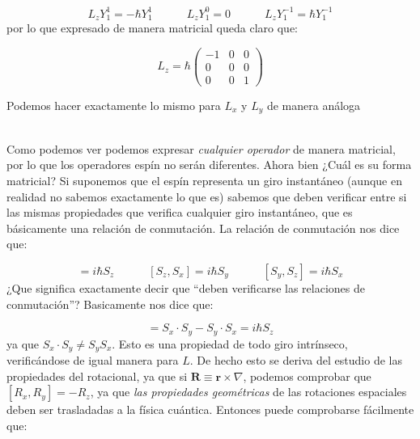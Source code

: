 \documentclass[12pt,a4paper]{article}
\numberwithin{equation}{section}
\numberwithin{figure}{section}
\newcommand{\tquad}{\quad \quad \quad}
\newcommand{\rn}{\mathbf{r}}
\newcommand{\Rn}{\mathbf{R}}
\begin{document}
$$L_z Y_1^1 =  - \hbar Y_1^1 \tquad L_z Y_1^0 = 0 \tquad L_z Y_1^{-1} = \hbar Y_1^{-1}$$
por lo que expresado de manera matricial queda claro que:

\begin{equation}
L_z = \hbar \begin{pmatrix}
-1 & 0 & 0 \\
0 & 0 & 0 \\
0 & 0 & 1
\end{pmatrix}
\end{equation}

Podemos hacer exactamente lo mismo para $L_x$ y $L_y$ de manera análoga

\hrulefill \\

Como podemos ver podemos expresar \textit{cualquier operador} de manera matricial, por lo que los operadores espín no serán diferentes. Ahora bien ¿Cuál es su forma matricial? Si suponemos que el espín representa un giro instantáneo (aunque en realidad no sabemos exactamente lo que es) sabemos que deben verificar entre si las mismas propiedades que verifica cualquier giro instantáneo, que es básicamente una relación de conmutación. La relación de conmutación nos dice que:

\begin{equation}
[S_x,S_z] = i \hbar S_z \tquad [S_z,S_x] = i \hbar S_y \tquad [S_y,S_z] = i \hbar S_x
\end{equation} 
¿Que significa exactamente decir que ``deben verificarse las relaciones de conmutación''? Basicamente nos dice que:

\begin{equation}
[S_x,S_y] = S_x \cdot S_y - S_y \cdot S_x = i \hbar S_z
\end{equation}
ya que $S_x \cdot S_y \neq S_y S_x$. Esto es una propiedad de todo giro intrínseco, verificándose de igual manera para $L$. De hecho esto se deriva del estudio de las propiedades del rotacional, ya que si $\Rn \equiv \rn \times \nabla$, podemos comprobar que $[R_x,R_y] =  - R_z$, ya que \textit{las propiedades geométricas} de las rotaciones espaciales deben ser trasladadas a la física cuántica. Entonces puede comprobarse fácilmente que:
\end{document}
